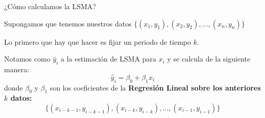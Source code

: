 \documentclass[aspectratio=169, usenames,dvipsnames]{beamer}
\begin{document}
\begin{frame}
    \Large
    ¿Cómo calculamos la LSMA?

    \normalsize
    Supongamos que tenemos nuestros datos $\{(x_1, y_1), (x_2, y_2), \dots, (x_n, y_n)\}$

    \vspace{1em}
    Lo primero que hay que hacer es fijar un periodo de tiempo $k$.

    \vspace{1em}
    Notamos como $\hat{y}_i$ a la estimación de LSMA para $x_i$ y se calcula de la siguiente manera:
    \[\hat{y}_i = \beta_0 + \beta_1 x_i \]
    donde $\beta_0$ y $\beta_1$ son los coeficientes de la \textbf{Regresión Lineal sobre los anteriores $k$ datos:} 
    \[\{(x_{i-k-1}, y_{i-k-1}), (x_{i-k}, y_{i-k}), \dots, (x_{i-1}, y_{i-1})\}\]
\end{frame}
\end{document}
